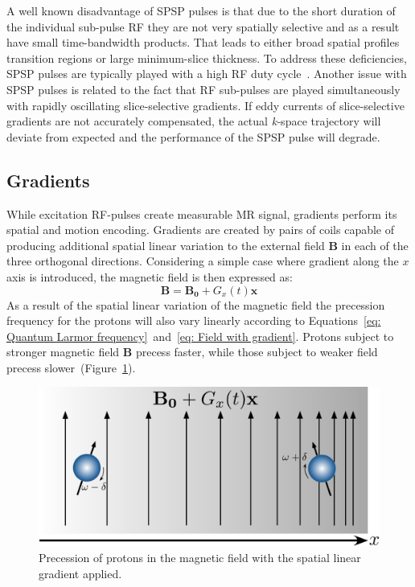 A well known disadvantage of SPSP pulses is that due to the short duration of the individual sub-pulse RF they are not very spatially selective and as a result have small time-bandwidth products. 
That leads to either  broad spatial profiles transition regions or large minimum-slice thickness. 
To address these deficiencies, SPSP pulses are typically played with a high RF duty cycle~\cite{RNDT24}. 
Another issue with SPSP pulses is related to the fact that RF sub-pulses are played simultaneously with rapidly oscillating slice-selective gradients. 
If eddy currents of slice-selective gradients are not accurately compensated, the actual \mbox{\textit{k-}space} trajectory will deviate from expected and the performance of the SPSP pulse will degrade.
\subsection{Gradients}
While excitation RF-pulses create measurable MR signal, gradients perform its spatial and motion encoding. 
Gradients are created by pairs of coils capable of producing additional spatial linear variation to the external field $\mathbf{B}$ in each of the three orthogonal directions. 
Considering a simple case where gradient along the $x$ axis is introduced, the  magnetic field is then expressed as:
\begin{equation}\label{eq: Field with gradient}
	\mathbf{B} = \mathbf{B_0} + G_x(t) \mathbf{x}
\end{equation}
As a result of the spatial linear variation of the magnetic field the precession frequency for the protons will also vary linearly according to Equations~\ref{eq: Quantum Larmor frequency}~and~\ref{eq: Field with gradient}.
 Protons subject to stronger magnetic field $\mathbf{B}$ precess faster, while those subject to weaker field precess slower~(Figure~\ref{fig: ProtonGradient}). 
\begin{figure}[!h]
\vspace{+0.2cm}
\centering
\includegraphics[scale=.4]{Figures/ProtonGradient.pdf}
\caption[Precession of protons in the magnetic field with the spatial linear gradient]{Precession of protons in the magnetic field with the spatial linear gradient applied.}
\label{fig: ProtonGradient}
\end{figure}
